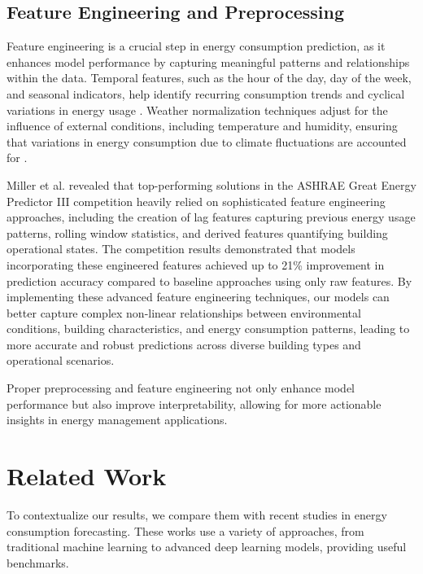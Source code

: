 \subsection{Feature Engineering and Preprocessing}
Feature engineering is a crucial step in energy consumption prediction, as it enhances model performance by capturing meaningful patterns and relationships within the data. Temporal features, such as the hour of the day, day of the week, and seasonal indicators, help identify recurring consumption trends and cyclical variations in energy usage \cite{deb2017review}. Weather normalization techniques adjust for the influence of external conditions, including temperature and humidity, ensuring that variations in energy consumption due to climate fluctuations are accounted for \cite{gao2018data}. 

Miller et al. \cite{miller2020ashrae} revealed that top-performing solutions in the ASHRAE Great Energy Predictor III competition heavily relied on sophisticated feature engineering approaches, including the creation of lag features capturing previous energy usage patterns, rolling window statistics, and derived features quantifying building operational states. The competition results demonstrated that models incorporating these engineered features achieved up to 21\% improvement in prediction accuracy compared to baseline approaches using only raw features. By implementing these advanced feature engineering techniques, our models can better capture complex non-linear relationships between environmental conditions, building characteristics, and energy consumption patterns, leading to more accurate and robust predictions across diverse building types and operational scenarios.

Proper preprocessing and feature engineering not only enhance model performance but also improve interpretability, allowing for more actionable insights in energy management applications.


\section{Related Work}

To contextualize our results, we compare them with recent studies in energy consumption forecasting. These works use a variety of approaches, from traditional machine learning to advanced deep learning models, providing useful benchmarks.

